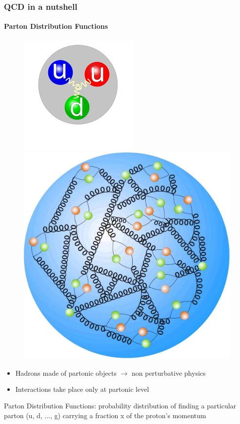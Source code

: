 \documentclass[aspectratio=43]{beamer}
\begin{document}
\begin{frame}

	\frametitle{QCD in a nutshell}
	\framesubtitle{Parton Distribution Functions}
	
	\begin{figure}
		\includegraphics[width = 0.5\linewidth]{proton.png}
		\endminipage\hfill
		\includegraphics[width = 0.4\linewidth]{proton2.jpg}
		\endminipage
	\end{figure}
	

	\begin{itemize}
		\item Hadrons made of partonic objects $\longrightarrow$ non perturbative physics
		\item Interactions take place only at partonic level
	\end{itemize}

	{\color{blue}Parton Distribution Functions: probability distribution of finding a particular parton (u, d, ..., g) carrying a fraction x of the proton's momentum}

\end{frame}
\end{document}
